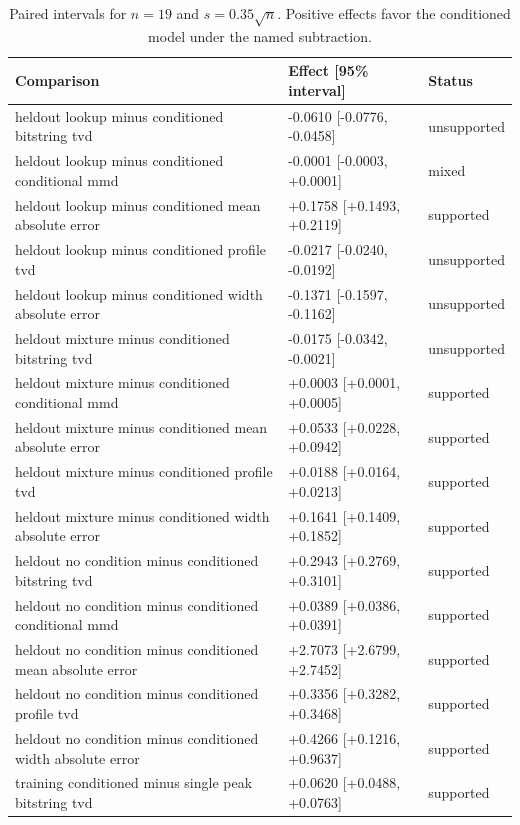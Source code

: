 \begin{table}[p]
\centering
\scriptsize
\setlength{\tabcolsep}{4pt}
\caption{Paired intervals for $n=19$ and $s=0.35\sqrt n$. Positive effects favor the conditioned model under the named subtraction.}
\label{tab:all-intervals-n19-w0.35}
\begin{tabular}{@{}p{}p{}p{}@{}}
\toprule
Comparison & Effect [95\% interval] & Status\\
\midrule
heldout lookup minus conditioned bitstring tvd & -0.0610 [-0.0776, -0.0458] & unsupported \\
heldout lookup minus conditioned conditional mmd & -0.0001 [-0.0003, +0.0001] & mixed \\
heldout lookup minus conditioned mean absolute error & +0.1758 [+0.1493, +0.2119] & supported \\
heldout lookup minus conditioned profile tvd & -0.0217 [-0.0240, -0.0192] & unsupported \\
heldout lookup minus conditioned width absolute error & -0.1371 [-0.1597, -0.1162] & unsupported \\
heldout mixture minus conditioned bitstring tvd & -0.0175 [-0.0342, -0.0021] & unsupported \\
heldout mixture minus conditioned conditional mmd & +0.0003 [+0.0001, +0.0005] & supported \\
heldout mixture minus conditioned mean absolute error & +0.0533 [+0.0228, +0.0942] & supported \\
heldout mixture minus conditioned profile tvd & +0.0188 [+0.0164, +0.0213] & supported \\
heldout mixture minus conditioned width absolute error & +0.1641 [+0.1409, +0.1852] & supported \\
heldout no condition minus conditioned bitstring tvd & +0.2943 [+0.2769, +0.3101] & supported \\
heldout no condition minus conditioned conditional mmd & +0.0389 [+0.0386, +0.0391] & supported \\
heldout no condition minus conditioned mean absolute error & +2.7073 [+2.6799, +2.7452] & supported \\
heldout no condition minus conditioned profile tvd & +0.3356 [+0.3282, +0.3468] & supported \\
heldout no condition minus conditioned width absolute error & +0.4266 [+0.1216, +0.9637] & supported \\
training conditioned minus single peak bitstring tvd & +0.0620 [+0.0488, +0.0763] & supported \\

\end{tabular}
\end{table}
